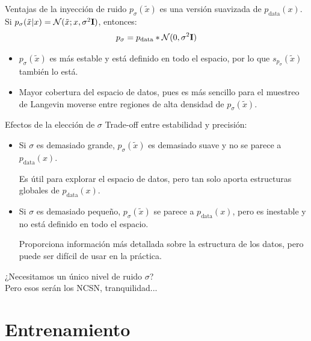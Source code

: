 \documentclass{beamer}
\begin{document}
\begin{frame}{Ventajas de la inyección de ruido}
    $p_\sigma(\tilde{x})$ es una versión suavizada de $p_{\text{data}}(x)$. Si $p_{\sigma}(\tilde{x}|x)=\mathcal{N}(\tilde{x};x,\sigma^2\mathbf{I})$, entonces:
    \begin{equation*}
        p_\sigma = p_{\text{data}} * \mathcal{N}(0,\sigma^2\mathbf{I})
    \end{equation*}\pause
    \begin{itemize}
        \item $p_\sigma(\tilde{x})$ es más estable y está definido en todo el espacio, por lo que $s_{p_\sigma}(\tilde{x})$ también lo está.\pause
        \item Mayor cobertura del espacio de datos, pues es más sencillo para el muestreo de Langevin moverse entre regiones de alta densidad de $p_\sigma(\tilde{x})$.
    \end{itemize}    
\end{frame}

\begin{frame}{Efectos de la elección de $\sigma$}
    Trade-off entre estabilidad y precisión:\pause
    \begin{itemize}
        \item Si $\sigma$ es demasiado grande, $p_\sigma(\tilde{x})$ es demasiado suave y no se parece a $p_{\text{data}}(x)$.
        
        Es útil para explorar el espacio de datos, pero tan solo aporta estructuras globales de $p_{\text{data}}(x)$.\pause
        \item Si $\sigma$ es demasiado pequeño, $p_\sigma(\tilde{x})$ se parece a $p_{\text{data}}(x)$, pero es inestable y no está definido en todo el espacio.
        
        Proporciona información más detallada sobre la estructura de los datos, pero puede ser difícil de usar en la práctica.
    \end{itemize}\pause

    \begin{center}
        ¿Necesitamos un único nivel de ruido $\sigma$? \pause\\
        Pero esos serán los NCSN, tranquilidad...
    \end{center}
\end{frame}


\section{Entrenamiento}
\end{document}
